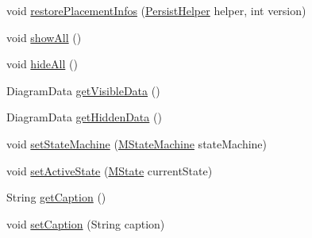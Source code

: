 \begin{DoxyCompactItemize}
\item 
void \hyperlink{classorg_1_1tzi_1_1use_1_1gui_1_1views_1_1diagrams_1_1statemachine_1_1_state_machine_diagram_aea6cd01f68050a6518c5bb00e13b3bb6}{restore\-Placement\-Infos} (\hyperlink{classorg_1_1tzi_1_1use_1_1gui_1_1util_1_1_persist_helper}{Persist\-Helper} helper, int version)
\item 
void \hyperlink{classorg_1_1tzi_1_1use_1_1gui_1_1views_1_1diagrams_1_1statemachine_1_1_state_machine_diagram_a4dbcdf15f1f1b7440c1397a69230631e}{show\-All} ()
\item 
void \hyperlink{classorg_1_1tzi_1_1use_1_1gui_1_1views_1_1diagrams_1_1statemachine_1_1_state_machine_diagram_a65b0631298f5d7e0b88949d4747e2e02}{hide\-All} ()
\item 
Diagram\-Data \hyperlink{classorg_1_1tzi_1_1use_1_1gui_1_1views_1_1diagrams_1_1statemachine_1_1_state_machine_diagram_ae84a08573a46d0224e43a3aba6e2e97f}{get\-Visible\-Data} ()
\item 
Diagram\-Data \hyperlink{classorg_1_1tzi_1_1use_1_1gui_1_1views_1_1diagrams_1_1statemachine_1_1_state_machine_diagram_a9d41aea73dbf469fe71fbd10d9dcb735}{get\-Hidden\-Data} ()
\item 
void \hyperlink{classorg_1_1tzi_1_1use_1_1gui_1_1views_1_1diagrams_1_1statemachine_1_1_state_machine_diagram_a36324a683fc8a9c8d51d1a24d9af7d5b}{set\-State\-Machine} (\hyperlink{classorg_1_1tzi_1_1use_1_1uml_1_1mm_1_1statemachines_1_1_m_state_machine}{M\-State\-Machine} state\-Machine)
\item 
void \hyperlink{classorg_1_1tzi_1_1use_1_1gui_1_1views_1_1diagrams_1_1statemachine_1_1_state_machine_diagram_afd44c0008367f39b0cd9eeb6a6f2223b}{set\-Active\-State} (\hyperlink{classorg_1_1tzi_1_1use_1_1uml_1_1mm_1_1statemachines_1_1_m_state}{M\-State} current\-State)
\item 
String \hyperlink{classorg_1_1tzi_1_1use_1_1gui_1_1views_1_1diagrams_1_1statemachine_1_1_state_machine_diagram_adc2ffd13b992ddfd7f35c034a04eb4aa}{get\-Caption} ()
\item 
void \hyperlink{classorg_1_1tzi_1_1use_1_1gui_1_1views_1_1diagrams_1_1statemachine_1_1_state_machine_diagram_a80411dffcf5dff3c82ea15c190b3f600}{set\-Caption} (String caption)
\end{DoxyCompactItemize}
